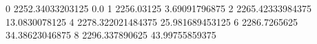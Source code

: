 0 2252.34033203125 0.0
1 2256.03125 3.69091796875
2 2265.42333984375 13.0830078125
4 2278.322021484375 25.981689453125
6 2286.7265625 34.38623046875
8 2296.337890625 43.99755859375
